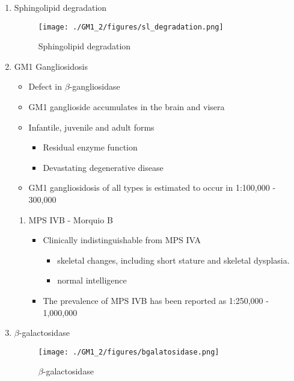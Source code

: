 \documentclass{scrartcl}
\begin{document}
\begin{enumerate}
\item Sphingolipid degradation
\label{sec:org84517fd}

\begin{figure}[htbp]
\centering
\texttt{[image: ./GM1\_2/figures/sl\_degradation.png]}
\caption{\label{fig:org64272fc}
Sphingolipid degradation}
\end{figure}

\item GM1 Gangliosidosis
\label{sec:org071cfe9}
\begin{itemize}
\item Defect in \(\beta\)-gangliosidase
\item GM1 ganglioside accumulates in the brain and visera
\item Infantile, juvenile and adult forms
\begin{itemize}
\item Residual enzyme function
\item Devastating degenerative disease
\end{itemize}
\item GM1 gangliosidosis of all types is estimated to occur in 1:100,000 - 300,000
\end{itemize}

\begin{enumerate}
\item MPS IVB - Morquio B
\label{sec:org2631ff2}
\begin{itemize}
\item Clinically indistinguishable from MPS IVA
\begin{itemize}
\item skeletal changes, including short stature and skeletal dysplasia.
\item normal intelligence
\end{itemize}
\item The prevalence of MPS IVB has been reported as 1:250,000 - 1,000,000
\end{itemize}
\end{enumerate}


\item \(\beta\)-galactosidase
\label{sec:org7dbbf38}
\begin{figure}[htbp]
\centering
\texttt{[image: ./GM1\_2/figures/bgalatosidase.png]}
\caption{\label{fig:org61e72e0}
\(\beta\)-galactosidase}
\end{figure}



\end{enumerate}
\end{document}
